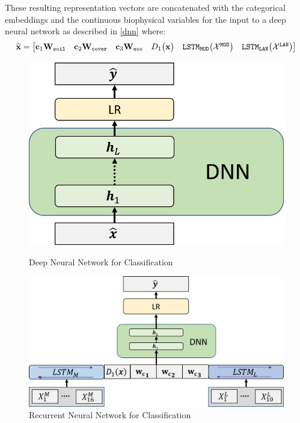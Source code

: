 \documentclass{article} %
\begin{document}
These resulting representation vectors are concatenated with the categorical embeddings and the continuous biophysical variables for the input to a deep neural network as described in \ref{dnn} where:
\begin{equation}
\widehat{{\bf x}} = \begin{bmatrix}{\bf c}_1{\bf W}_{\texttt{soil}}&{\bf c}_2{\bf W}_{\texttt{cover}}&{\bf c}_3{\bf W}_{\texttt{eco}}&D_1 \bigl({\bf x}\bigr) &\texttt{LSTM}_{\texttt{MOD}}\bigl(\mathcal{X}^{\texttt{MOD}}\bigr)&\texttt{LSTM}_{\texttt{LAN}}\bigl(\mathcal{X}^{\texttt{LAN}}\bigr)\end{bmatrix}
\end{equation}

\begin{figure}
\centering
\begin{minipage}{.48\textwidth}
  \centering
\includegraphics[width=\textwidth]{pics/dnn.png}
\caption{Deep Neural Network for Classification}\label{fig:dnn}
\end{minipage}
\begin{minipage}{.04\textwidth}
\end{minipage}
\begin{minipage}{.48\textwidth}
  \centering
\includegraphics[width=\textwidth]{pics/rnn.png}
\caption{Recurrent Neural Network for Classification}\label{fig:rnn}
\end{minipage}
\end{figure}
\end{document}
